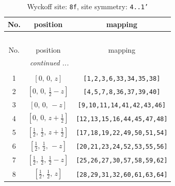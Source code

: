 \documentclass[fleqn,8pt]{jsarticle}
\begin{document}
\begin{longtable}{ccc}
\caption{Wyckoff site: {\tt 8f}, site symmetry: {\tt 4..1'}}
 \\
 \hline \hline
No. & position & mapping \\ \hline \endfirsthead

\multicolumn{2}{l}{\tablename\ \thetable{}} \\
 \hline \hline
No. & position & mapping \\ \hline \endhead

 \hline \hline
\multicolumn{2}{r}{\footnotesize\it continued ...} \\ \endfoot

 \hline \hline
\multicolumn{2}{r}{} \\ \endlastfoot

1 & $\left[ 0,\, 0,\, z \right]$ & {\tt [1,2,3,6,33,34,35,38]} \\ \hline
2 & $\left[ 0,\, 0,\, \frac{1}{2} - z \right]$ & {\tt [4,5,7,8,36,37,39,40]} \\ \hline
3 & $\left[ 0,\, 0,\, - z \right]$ & {\tt [9,10,11,14,41,42,43,46]} \\ \hline
4 & $\left[ 0,\, 0,\, z + \frac{1}{2} \right]$ & {\tt [12,13,15,16,44,45,47,48]} \\ \hline
5 & $\left[ \frac{1}{2},\, \frac{1}{2},\, z + \frac{1}{2} \right]$ & {\tt [17,18,19,22,49,50,51,54]} \\ \hline
6 & $\left[ \frac{1}{2},\, \frac{1}{2},\, - z \right]$ & {\tt [20,21,23,24,52,53,55,56]} \\ \hline
7 & $\left[ \frac{1}{2},\, \frac{1}{2},\, \frac{1}{2} - z \right]$ & {\tt [25,26,27,30,57,58,59,62]} \\ \hline
8 & $\left[ \frac{1}{2},\, \frac{1}{2},\, z \right]$ & {\tt [28,29,31,32,60,61,63,64]} \\
\end{longtable}
\renewcommand{\arraystretch}{1.2}
\end{document}
